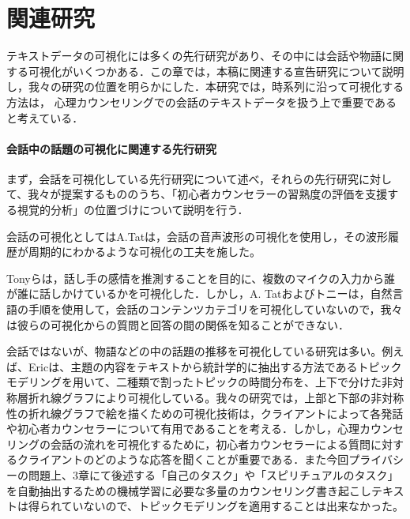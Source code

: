\documentclass[shuuron]{kuee}
\begin{document}







\chapter{関連研究}






  テキストデータの可視化には多くの先行研究があり、その中には会話や物語に関する可視化がいくつかある．この章では，本稿に関連する宣告研究について説明し，我々の研究の位置を明らかにした．本研究では，時系列に沿って可視化する方法は， 心理カウンセリングでの会話のテキストデータを扱う上で重要であると考えている．





\subsubsection{会話中の話題の可視化に関連する先行研究}

まず，会話を可視化している先行研究について述べ，それらの先行研究に対して、我々が提案するもののうち、「初心者カウンセラーの習熟度の評価を支援する視覚的分析」の位置づけについて説明を行う．




  会話の可視化としてはA.Tat\cite{tat2002visualising}は，会話の音声波形の可視化を使用し，その波形履歴が周期的にわかるような可視化の工夫を施した。

Tonyら\cite{bergstrom2007seeing}は，話し手の感情を推測することを目的に、複数のマイクの入力から誰が誰に話しかけているかを可視化した．しかし，A. Tatおよびトニーは，自然言語の手順を使用して，会話のコンテンツカテゴリを可視化していないので，我々は彼らの可視化からの質問と回答の間の関係を知ることができない．


会話ではないが、物語などの中の話題の推移を可視化している研究は多い。例えば、Eric\cite{taskdriven}は、主題の内容をテキストから統計学的に抽出する方法であるトピックモデリングを用いて、二種類で割ったトピックの時間分布を、上下で分けた非対称層折れ線グラフにより可視化している。我々の研究では，上部と下部の非対称性の折れ線グラフで絵を描くための可視化技術は，クライアントによって各発話や初心者カウンセラーについて有用であることを考える．しかし，心理カウンセリングの会話の流れを可視化するために，初心者カウンセラーによる質問に対するクライアントのどのような応答を聞くことが重要である．また今回プライバシーの問題上、3章にて後述する「自己のタスク」や「スピリチュアルのタスク」を自動抽出するための機械学習に必要な多量のカウンセリング書き起こしテキストは得られていないので、トピックモデリングを適用することは出来なかった。
\end{document}
